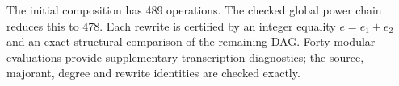 The initial composition has 489 operations. The checked global power chain
reduces this to 478. Each rewrite is certified by an integer equality
$e=e_1+e_2$ and an exact structural comparison of the remaining DAG.
Forty modular evaluations provide supplementary transcription diagnostics;
the source, majorant, degree and rewrite identities are checked exactly.
